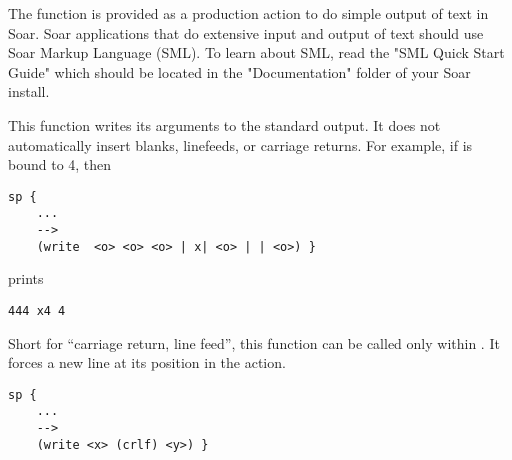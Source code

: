 The function  is provided as a production
action to do simple output of text in Soar. Soar applications that
do extensive input and output of text should use Soar Markup Language (SML). To learn
about SML, read the "SML Quick Start Guide" which should be located in the "Documentation" 
folder of your Soar install.

 
\begin{description}
\item [\soarb{write} --- ] This function writes its arguments to the standard
        output. It does not automatically insert blanks, linefeeds, or carriage
        returns.  For example, if  is bound to 4, then
\begin{verbatim}
sp {
    ...
    -->
    (write  <o> <o> <o> | x| <o> | | <o>) }
\end{verbatim}
        prints

\begin{verbatim}
444 x4 4
\end{verbatim}

\item [\soarb{crlf} --- ] Short for ``carriage return, line feed'', this
        function can be called only within . It forces a new line
        at its position in the  action. 
\begin{verbatim}
sp {
    ...
    -->
    (write <x> (crlf) <y>) }
\end{verbatim}





\end{description}

